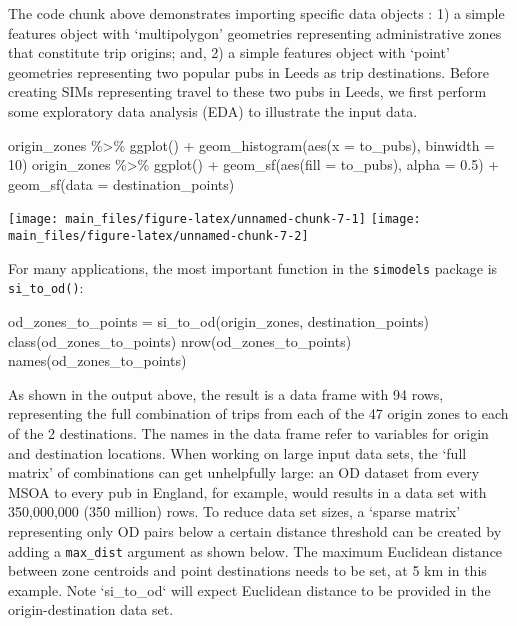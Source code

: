 \documentclass[11pt,letterpaper]{article}
\newenvironment{Shaded}{\begin{snugshade}}{\end{snugshade}}
\newcommand{\AttributeTok}[1]{\textcolor[rgb]{0.77,0.63,0.00}{#1}}
\newcommand{\DecValTok}[1]{\textcolor[rgb]{0.00,0.00,0.81}{#1}}
\newcommand{\FloatTok}[1]{\textcolor[rgb]{0.00,0.00,0.81}{#1}}
\newcommand{\FunctionTok}[1]{\textcolor[rgb]{0.00,0.00,0.00}{#1}}
\newcommand{\NormalTok}[1]{#1}
\newcommand{\OtherTok}[1]{\textcolor[rgb]{0.56,0.35,0.01}{#1}}
\newcommand{\SpecialCharTok}[1]{\textcolor[rgb]{0.00,0.00,0.00}{#1}}
\begin{document}
The code chunk above demonstrates importing specific data objects : 1) a simple features object with `multipolygon' geometries representing administrative zones that constitute trip origins; and, 2) a simple features object with `point' geometries representing two popular pubs in Leeds as trip destinations.
Before creating SIMs representing travel to these two pubs in Leeds, we first perform some exploratory data analysis (EDA) to illustrate the input data.

\begin{Shaded}
\begin{Highlighting}[]
\NormalTok{origin\_zones }\SpecialCharTok{\%\textgreater{}\%} 
  \FunctionTok{ggplot}\NormalTok{() }\SpecialCharTok{+}
  \FunctionTok{geom\_histogram}\NormalTok{(}\FunctionTok{aes}\NormalTok{(}\AttributeTok{x =}\NormalTok{ to\_pubs), }\AttributeTok{binwidth =} \DecValTok{10}\NormalTok{)}
\NormalTok{origin\_zones }\SpecialCharTok{\%\textgreater{}\%} 
  \FunctionTok{ggplot}\NormalTok{() }\SpecialCharTok{+}
  \FunctionTok{geom\_sf}\NormalTok{(}\FunctionTok{aes}\NormalTok{(}\AttributeTok{fill =}\NormalTok{ to\_pubs), }\AttributeTok{alpha =} \FloatTok{0.5}\NormalTok{) }\SpecialCharTok{+}
  \FunctionTok{geom\_sf}\NormalTok{(}\AttributeTok{data =}\NormalTok{ destination\_points)}
\end{Highlighting}
\end{Shaded}

\texttt{[image: main\_files/figure-latex/unnamed-chunk-7-1]} \texttt{[image: main\_files/figure-latex/unnamed-chunk-7-2]}

For many applications, the most important function in the \texttt{simodels} package is \texttt{si\_to\_od()}:

\begin{Shaded}
\begin{Highlighting}[]
\NormalTok{od\_zones\_to\_points }\OtherTok{=} \FunctionTok{si\_to\_od}\NormalTok{(origin\_zones, destination\_points)}
\FunctionTok{class}\NormalTok{(od\_zones\_to\_points)}
\FunctionTok{nrow}\NormalTok{(od\_zones\_to\_points)}
\FunctionTok{names}\NormalTok{(od\_zones\_to\_points)}
\end{Highlighting}
\end{Shaded}

As shown in the output above, the result is a data frame with 94 rows, representing the full combination of trips from each of the 47 origin zones to each of the 2 destinations.
The names in the data frame refer to variables for origin and destination locations.
When working on large input data sets, the `full matrix' of combinations can get unhelpfully large: an OD dataset from every MSOA to every pub in England, for example, would results in a data set with 350,000,000 (350 million) rows.
To reduce data set sizes, a `sparse matrix' representing only OD pairs below a certain distance threshold can be created by adding a \texttt{max\_dist} argument as shown below.
The maximum Euclidean distance between zone centroids and point destinations needs to be set, at 5 km in this example.
Note `si\_to\_od` will expect Euclidean distance to be provided in the origin-destination data set.
\end{document}
